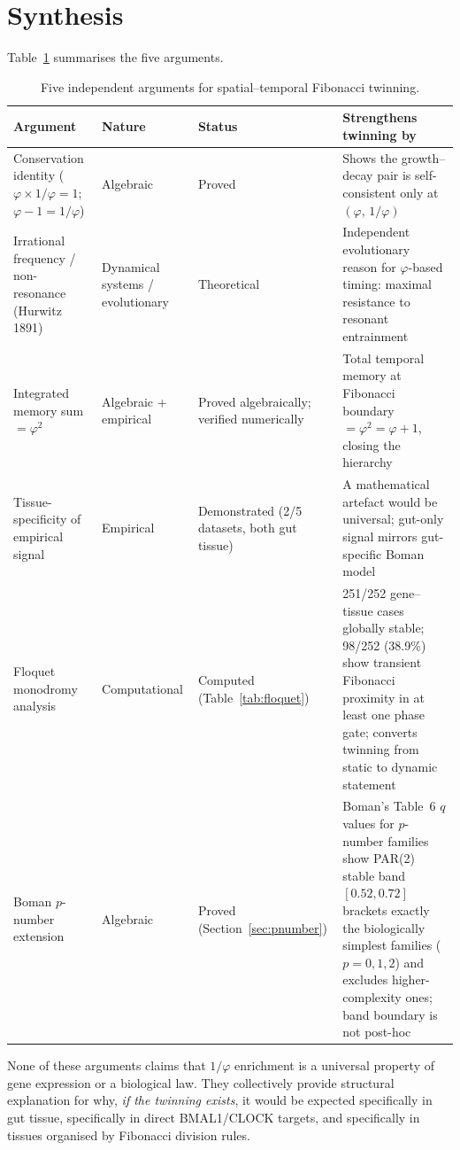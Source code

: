 \documentclass[11pt,letterpaper]{article}
\theoremstyle{definition}
\theoremstyle{remark}
\begin{document}
\section{Synthesis}
\label{sec:synthesis}

Table~\ref{tab:synthesis} summarises the five arguments.

\begin{table}[H]
\centering
\caption{Five independent arguments for spatial--temporal Fibonacci twinning.}
\label{tab:synthesis}
\begin{tabular}{p{4cm}p{2.5cm}p{2.5cm}p{5cm}}
\toprule
Argument & Nature & Status & Strengthens twinning by \\
\midrule
Conservation identity ($\varphi \times 1/\varphi = 1$; $\varphi - 1 = 1/\varphi$)
& Algebraic
& Proved
& Shows the growth--decay pair is self-consistent only at $(\varphi,\, 1/\varphi)$ \\
\addlinespace
Irrational frequency / non-resonance (Hurwitz 1891)
& Dynamical systems / evolutionary
& Theoretical
& Independent evolutionary reason for $\varphi$-based timing: maximal resistance to resonant entrainment \\
\addlinespace
Integrated memory sum $= \varphi^2$
& Algebraic + empirical
& Proved algebraically; verified numerically
& Total temporal memory at Fibonacci boundary $= \varphi^2 = \varphi + 1$, closing the hierarchy \\
\addlinespace
Tissue-specificity of empirical signal
& Empirical
& Demonstrated (2/5 datasets, both gut tissue)
& A mathematical artefact would be universal; gut-only signal mirrors gut-specific Boman model \\
\addlinespace
Floquet monodromy analysis
& Computational
& Computed (Table~\ref{tab:floquet})
& 251/252 gene--tissue cases globally stable; 98/252 (38.9\%) show transient Fibonacci proximity in at least one phase gate; converts twinning from static to dynamic statement \\
\addlinespace
Boman $p$-number extension
& Algebraic
& Proved (Section~\ref{sec:pnumber})
& Boman's Table~6 $q$ values for $p$-number families show PAR(2) stable band $[0.52, 0.72]$ brackets exactly the biologically simplest families ($p=0,1,2$) and excludes higher-complexity ones; band boundary is not post-hoc \\
\bottomrule
\end{tabular}
\end{table}

\noindent None of these arguments claims that $1/\varphi$ enrichment is a universal property of
gene expression or a biological law. They collectively provide structural explanation for why,
\emph{if the twinning exists}, it would be expected specifically in gut tissue, specifically in
direct BMAL1/CLOCK targets, and specifically in tissues organised by Fibonacci division rules.
\end{document}
